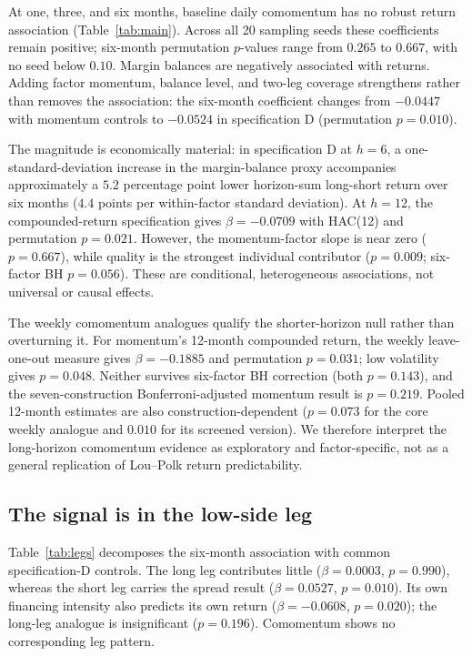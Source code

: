 \documentclass[final,1p,authoryear]{elsarticle}
\begin{document}
\noindent At one, three, and six months, baseline daily comomentum has no robust return association
(Table~\ref{tab:main}). Across all 20 sampling seeds these coefficients remain positive; six-month
permutation $p$-values range from $0.265$ to $0.667$, with no seed below $0.10$.
Margin balances are negatively associated with returns. Adding factor
momentum, balance level, and two-leg coverage strengthens rather than removes the association:
the six-month coefficient changes from $-0.0447$ with momentum controls to $-0.0524$ in
specification D (permutation $p=0.010$).

\begin{table}[htbp]\centering
\caption{Crowding and future factor returns}
\label{tab:main}

\end{table}

The magnitude is economically material: in specification D at $h=6$, a one-standard-deviation
increase in the margin-balance proxy accompanies approximately a $5.2$ percentage point lower
horizon-sum long-short return over six months ($4.4$ points per within-factor standard deviation).
At $h=12$, the compounded-return specification gives $\beta=-0.0709$ with HAC(12) and permutation
$p=0.021$. However, the momentum-factor slope is near zero ($p=0.667$), while quality is the
strongest individual contributor ($p=0.009$; six-factor BH $p=0.056$). These are conditional,
heterogeneous associations, not universal or causal effects.

The weekly comomentum analogues qualify the shorter-horizon null rather than overturning it.
For momentum's 12-month compounded return, the weekly leave-one-out measure gives
$\beta=-0.1885$ and permutation $p=0.031$; low volatility gives $p=0.048$. Neither survives
six-factor BH correction (both $p=0.143$), and the seven-construction Bonferroni-adjusted
momentum result is $p=0.219$. Pooled 12-month estimates are also construction-dependent
($p=0.073$ for the core weekly analogue and $0.010$ for its screened version). We therefore
interpret the long-horizon comomentum evidence as exploratory and factor-specific, not as a
general replication of Lou--Polk return predictability.


\subsection{The signal is in the low-side leg}

\noindent Table~\ref{tab:legs} decomposes the six-month association with common specification-D
controls. The long leg contributes little ($\beta=0.0003$, $p=0.990$), whereas the short leg
carries the spread result ($\beta=0.0527$, $p=0.010$). Its own financing intensity also predicts
its own return ($\beta=-0.0608$, $p=0.020$); the long-leg analogue is insignificant ($p=0.196$).
Comomentum shows no corresponding leg pattern.
\end{document}
